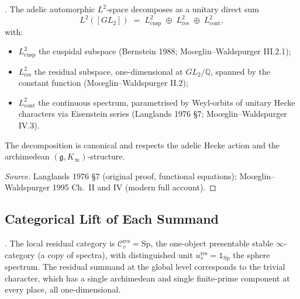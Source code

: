 \begin{theorem}
\label{v4-arith:w6-d:thm:Langlands-decomp}
\ClaimStatusProvedElsewhere. The adelic automorphic \(L^{2}\)-space
decomposes as a unitary direct sum
\begin{equation}
\label{v4-arith:w6-d:eq:Langlands-decomp}
L^{2}([GL_{2}])\;=\;L^{2}_{\mathrm{cusp}}\;\oplus\;L^{2}_{\mathrm{res}}\;\oplus\;L^{2}_{\mathrm{cont}},
\end{equation}
with:
\begin{itemize}
\item \(L^{2}_{\mathrm{cusp}}\) the cuspidal subspace
(Bernstein 1988; Mo{\oe}glin--Waldspurger III.2.1);
\item \(L^{2}_{\mathrm{res}}\) the residual subspace, one-dimensional
at \(GL_{2}/\mathbb{Q}\), spanned by the constant function
(Mo{\oe}glin--Waldspurger II.2);
\item \(L^{2}_{\mathrm{cont}}\) the continuous spectrum, parametrised
by Weyl-orbits of unitary Hecke characters via Eisenstein series
(Langlands 1976 \S 7; Mo{\oe}glin--Waldspurger IV.3).
\end{itemize}
The decomposition is canonical and respects the adelic Hecke action
and the archimedean \((\mathfrak{g},K_{\infty})\)-structure.
\end{theorem}

\begin{proof}[Source]
Langlands 1976 \S 7 (original proof, functional equations);
Mo{\oe}glin--Waldspurger 1995 Ch.~II and IV (modern full account).
\end{proof}

\subsection{Categorical Lift of Each Summand}

\begin{definition}
\label{v4-arith:w6-d:def:C-res-local}
\ClaimStatusDefinitional. The local residual category is
\(\mathcal{C}^{\mathrm{res}}_{v}=\mathrm{Sp}\), the one-object
presentable stable \(\infty\)-category (a copy of spectra), with
distinguished unit \(u^{\mathrm{res}}_{v}=\mathbb{1}_{\mathrm{Sp}}\)
the sphere spectrum. The residual summand at the global level
corresponds to the trivial character, which has a single
archimedean and single finite-prime component at every place, all
one-dimensional.
\end{definition}

